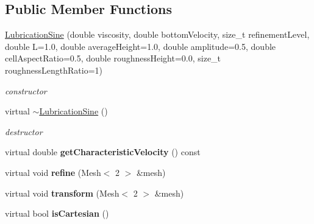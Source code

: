 \subsection*{Public Member Functions}
\begin{DoxyCompactItemize}
\item 
\hypertarget{classnatrium_1_1LubricationSine_aabde5d90ece7568bd26539679554dce3}{
\hyperlink{classnatrium_1_1LubricationSine_aabde5d90ece7568bd26539679554dce3}{LubricationSine} (double viscosity, double bottomVelocity, size\_\-t refinementLevel, double L=1.0, double averageHeight=1.0, double amplitude=0.5, double cellAspectRatio=0.5, double roughnessHeight=0.0, size\_\-t roughnessLengthRatio=1)}
\label{classnatrium_1_1LubricationSine_aabde5d90ece7568bd26539679554dce3}

\begin{DoxyCompactList}\small\item\em constructor \item\end{DoxyCompactList}\item 
\hypertarget{classnatrium_1_1LubricationSine_a5ccd2adc86fca412bbf13027ed5095dd}{
virtual \hyperlink{classnatrium_1_1LubricationSine_a5ccd2adc86fca412bbf13027ed5095dd}{$\sim$LubricationSine} ()}
\label{classnatrium_1_1LubricationSine_a5ccd2adc86fca412bbf13027ed5095dd}

\begin{DoxyCompactList}\small\item\em destructor \item\end{DoxyCompactList}\item 
\hypertarget{classnatrium_1_1LubricationSine_a141a35675ac18a639af4aa7d0690c96d}{
virtual double {\bfseries getCharacteristicVelocity} () const }
\label{classnatrium_1_1LubricationSine_a141a35675ac18a639af4aa7d0690c96d}

\item 
\hypertarget{classnatrium_1_1LubricationSine_a6f22664f888db4f1bf7c3cd72f7c107c}{
virtual void {\bfseries refine} (Mesh$<$ 2 $>$ \&mesh)}
\label{classnatrium_1_1LubricationSine_a6f22664f888db4f1bf7c3cd72f7c107c}

\item 
\hypertarget{classnatrium_1_1LubricationSine_a4c8a4b5d3321dfc31a754bb38d97700f}{
virtual void {\bfseries transform} (Mesh$<$ 2 $>$ \&mesh)}
\label{classnatrium_1_1LubricationSine_a4c8a4b5d3321dfc31a754bb38d97700f}

\item 
\hypertarget{classnatrium_1_1LubricationSine_a2a022202bb876047ac333d08c216b61a}{
virtual bool {\bfseries isCartesian} ()}
\label{classnatrium_1_1LubricationSine_a2a022202bb876047ac333d08c216b61a}

\end{DoxyCompactItemize}


